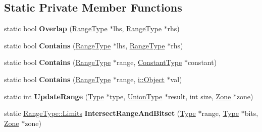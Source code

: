 \subsection*{Static Private Member Functions}
\begin{DoxyCompactItemize}
\item 
static bool {\bfseries Overlap} (\hyperlink{classv8_1_1internal_1_1_range_type}{Range\+Type} $\ast$lhs, \hyperlink{classv8_1_1internal_1_1_range_type}{Range\+Type} $\ast$rhs)\hypertarget{classv8_1_1internal_1_1_type_a9bb1ff1ba8938cc06cf01722bf162453}{}\label{classv8_1_1internal_1_1_type_a9bb1ff1ba8938cc06cf01722bf162453}

\item 
static bool {\bfseries Contains} (\hyperlink{classv8_1_1internal_1_1_range_type}{Range\+Type} $\ast$lhs, \hyperlink{classv8_1_1internal_1_1_range_type}{Range\+Type} $\ast$rhs)\hypertarget{classv8_1_1internal_1_1_type_a26477835d552b600be36dc4c59253711}{}\label{classv8_1_1internal_1_1_type_a26477835d552b600be36dc4c59253711}

\item 
static bool {\bfseries Contains} (\hyperlink{classv8_1_1internal_1_1_range_type}{Range\+Type} $\ast$range, \hyperlink{classv8_1_1internal_1_1_constant_type}{Constant\+Type} $\ast$constant)\hypertarget{classv8_1_1internal_1_1_type_a2d5b5c49e2d6107965b6aaa8472589ff}{}\label{classv8_1_1internal_1_1_type_a2d5b5c49e2d6107965b6aaa8472589ff}

\item 
static bool {\bfseries Contains} (\hyperlink{classv8_1_1internal_1_1_range_type}{Range\+Type} $\ast$range, \hyperlink{classv8_1_1internal_1_1_object}{i\+::\+Object} $\ast$val)\hypertarget{classv8_1_1internal_1_1_type_a0233a87add2386fcfb91dcbd55d1bfdc}{}\label{classv8_1_1internal_1_1_type_a0233a87add2386fcfb91dcbd55d1bfdc}

\item 
static int {\bfseries Update\+Range} (\hyperlink{classv8_1_1internal_1_1_type}{Type} $\ast$type, \hyperlink{classv8_1_1internal_1_1_union_type}{Union\+Type} $\ast$result, int size, \hyperlink{classv8_1_1internal_1_1_zone}{Zone} $\ast$zone)\hypertarget{classv8_1_1internal_1_1_type_aab2e13ebd74a4676a4e4d95ca86bc999}{}\label{classv8_1_1internal_1_1_type_aab2e13ebd74a4676a4e4d95ca86bc999}

\item 
static \hyperlink{structv8_1_1internal_1_1_range_type_1_1_limits}{Range\+Type\+::\+Limits} {\bfseries Intersect\+Range\+And\+Bitset} (\hyperlink{classv8_1_1internal_1_1_type}{Type} $\ast$range, \hyperlink{classv8_1_1internal_1_1_type}{Type} $\ast$bits, \hyperlink{classv8_1_1internal_1_1_zone}{Zone} $\ast$zone)\hypertarget{classv8_1_1internal_1_1_type_aadcb11d3e4f0a9940549f539d3b98ea1}{}\label{classv8_1_1internal_1_1_type_aadcb11d3e4f0a9940549f539d3b98ea1}


\end{DoxyCompactItemize}
